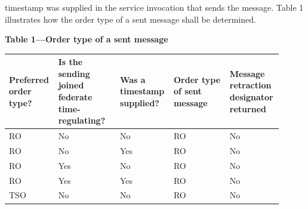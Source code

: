 \begin{compactstdpage}

    timestamp was supplied in the service invocation that sends the message. Table 1 illustrates how the order type of a sent message shall be determined.

    \begin{center}
        {\sffamily\bfseries\fontsize{8.5}{10}\selectfont Table 1---Order type of a sent message}\par\vspace{5pt}
    {\fontsize{6.3}{7.3}\selectfont\setlength{\tabcolsep}{2.7pt}\renewcommand{\arraystretch}{1.13}%
        \begin{tabular}{|>{\centering\arraybackslash}p{0.16\linewidth}|>{\centering\arraybackslash}p{0.22\linewidth}|>{\centering\arraybackslash}p{0.16\linewidth}|>{\centering\arraybackslash}p{0.20\linewidth}|>{\centering\arraybackslash}p{0.17\linewidth}|}
            \hline
            \textbf{Preferred order type?} & \textbf{Is the sending joined federate time-regulating?} & \textbf{Was a timestamp supplied?} & \textbf{Order type of sent message} & \textbf{Message retraction designator returned} \\ \hline
            RO                             & No                                                       & No                                 & RO                                  & No                                              \\ \hline
            RO                             & No                                                       & Yes                                & RO                                  & No                                              \\ \hline
            RO                             & Yes                                                      & No                                 & RO                                  & No                                              \\ \hline
            RO                             & Yes                                                      & Yes                                & RO                                  & No                                              \\ \hline
            TSO                            & No                                                       & No                                 & RO                                  & No                                              \\ \hline

\end{tabular}}
\end{center}
\end{compactstdpage}
